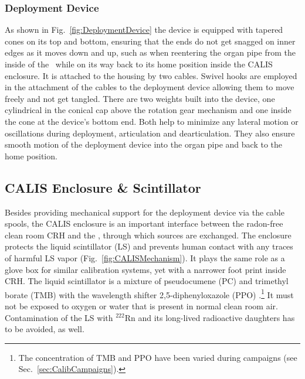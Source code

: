 \subsubsection*{Deployment Device}
As shown in Fig.~\ref{fig:DeploymentDevice} the device is equipped with tapered cones on its top and bottom, ensuring that the ends do not get snagged on inner edges as it moves down and up, such as when reentering the organ pipe from the inside of the \lsv\ while on its way back to its home position inside the CALIS enclosure. It is attached to the housing by two cables. Swivel hooks are employed in the attachment of the cables to the deployment device allowing them to move freely and not get tangled. 
There are two weights built into the device, one cylindrical in the conical cap above the rotation gear mechanism and one inside the cone at the device's bottom end. Both help to minimize any lateral motion or oscillations during deployment, articulation and dearticulation. They also ensure smooth motion of the deployment device into the organ pipe and back to the home position.


\subsection{CALIS Enclosure \& Scintillator}

Besides providing mechanical support for the deployment device via the cable spools, the CALIS enclosure is an important interface between the radon-free clean room CRH and the \lsv, through which sources are exchanged. 
The enclosure protects the liquid scintillator (LS) and prevents human contact with any traces of harmful LS vapor (Fig.~\ref{fig:CALISMechanism}). It plays the same role as a glove box for similar calibration systems, yet with a narrower foot print inside CRH. The liquid scintillator is a mixture of pseudocumene (PC) and trimethyl borate (TMB) with the wavelength shifter 2,5-diphenyloxazole (PPO) \cite{Agnes:2015qyz}.\footnote{The concentration of TMB and PPO have been varied during campaigns (see Sec.~\ref{sec:CalibCampaigns}).} %
It must not be exposed to oxygen or water that is present in normal clean room air. Contamination of the LS with $^{222}$Rn and its long-lived radioactive daughters has to be avoided, as well. 

